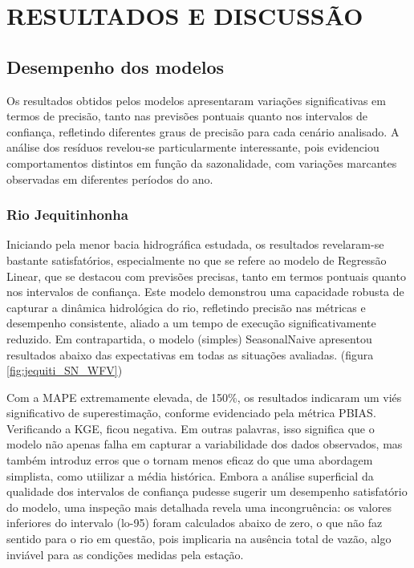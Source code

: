 \chapter{RESULTADOS E DISCUSS\~AO}
\label{cap:capitulo4}

\section{Desempenho dos modelos}

Os resultados obtidos pelos modelos apresentaram variações significativas em termos de precisão, tanto nas previsões pontuais quanto nos intervalos de confiança, refletindo diferentes graus de precisão para cada cenário analisado. A análise dos resíduos revelou-se particularmente interessante, pois evidenciou comportamentos distintos em função da sazonalidade, com variações marcantes observadas em diferentes períodos do ano.

\subsection{Rio Jequitinhonha}

Iniciando pela menor bacia hidrográfica estudada, os resultados revelaram-se bastante satisfatórios, especialmente no que se refere ao modelo de Regressão Linear, que se destacou com previsões precisas, tanto em termos pontuais quanto nos intervalos de confiança. Este modelo demonstrou uma capacidade robusta de capturar a dinâmica hidrológica do rio, refletindo precisão nas métricas e desempenho consistente, aliado a um tempo de execução significativamente reduzido. Em contrapartida, o modelo (simples) SeasonalNaive apresentou resultados abaixo das expectativas em todas as situações avaliadas. (figura \ref{fig:jequiti_SN_WFV})

Com a MAPE extremamente elevada, de 150\%, os resultados indicaram um viés significativo de superestimação, conforme evidenciado pela métrica PBIAS. Verificando a KGE, ficou negativa. Em outras palavras, isso significa que o modelo não apenas falha em capturar a variabilidade dos dados observados, mas também introduz erros que o tornam menos eficaz do que uma abordagem simplista, como utiilizar a média histórica. Embora a análise superficial da qualidade dos intervalos de confiança pudesse sugerir um desempenho satisfatório do modelo, uma inspeção mais detalhada revela uma incongruência: os valores inferiores do intervalo (lo-95) foram calculados abaixo de zero, o que não faz sentido para o rio em questão, pois implicaria na ausência total de vazão, algo inviável para as condições medidas pela estação.

